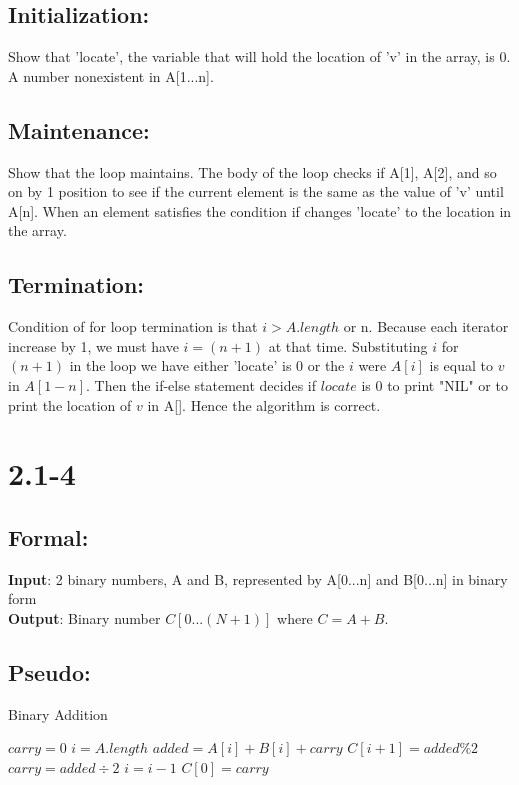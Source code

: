 \documentclass[12pt]{article}
\begin{document}
	\subsection*{Initialization:}
    Show that 'locate', the variable that will hold the location of 'v' in the array, is 0. A number nonexistent in A[1...n].
    \subsection*{Maintenance:}
    Show that the loop maintains. The body of the loop checks if A[1], A[2], and so on by 1 position to see if the current element is the same as the value of 'v' until A[n]. When an element satisfies the condition if changes 'locate' to the location in the array.
    \subsection*{Termination:}
    Condition of for loop termination is that $i > A.length$ or n. Because each iterator increase by 1, we must have $i=(n+1)$ at that time. Substituting $i$ for $(n+1)$ in the loop we have either 'locate' is 0 or the $i$ were $A[i]$ is equal to $v$ in $A[1-n]$. Then the if-else statement decides if $locate$ is 0 to print "NIL" or to print the location of $v$ in A[]. Hence the algorithm is correct.
\section{2.1-4}
    \subsection*{Formal:}
    \textbf{Input}: 2 binary numbers, A and B, represented by A[0...n] and B[0...n] in binary form\\
    \textbf{Output}: Binary number $C[0...(N+1)]$ where $C = A+B$.
    \subsection*{Pseudo:}   
	\begin{algorithm}
	\caption{Binary Addition}
	\begin{algorithmic} 
	\STATE $carry = 0$
	\STATE $ i = A.length $
		\STATE $added = A[i] + B[i] +carry $
		\STATE $C[i + 1] = added \% 2 $
		\STATE $ carry = added \div 2 $
		\STATE $ i = i - 1$
	\ENDWHILE
	\STATE $ C[0] = carry$
	\end{algorithmic}
	\end{algorithm}
\end{document}

